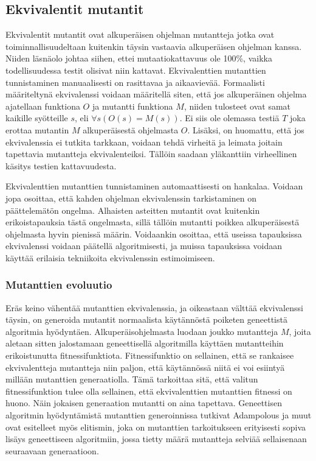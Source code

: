\documentclass{tktltiki}
\begin{document}
\subsection{Ekvivalentit mutantit}
Ekvivalentit mutantit ovat alkuperäisen ohjelman mutantteja jotka ovat toiminnallisuudeltaan kuitenkin täysin vastaavia alkuperäisen ohjelman kanssa. Niiden läsnäolo johtaa siihen, ettei mutaatiokattavuus ole 100\%, vaikka todellisuudessa testit olisivat niin kattavat. Ekvivalenttien mutanttien tunnistaminen manuaalisesti on rasittavaa ja aikaavievää. Formaalisti määriteltynä ekvivalenssi voidaan määritellä siten, että jos alkuperäinen ohjelma ajatellaan funktiona $O$ ja mutantti funktiona $M$, niiden tulosteet ovat samat kaikille syötteille $s$, eli $\forall s(O(s) = M(s))$. Ei siis ole olemassa testiä $T$ joka erottaa mutantin $M$ alkuperäisestä ohjelmasta $O$. Lisäksi, on huomattu, että jos ekvivalenssia ei tutkita tarkkaan, voidaan tehdä virheitä ja leimata joitain tapettavia mutantteja ekvivalenteiksi. Tällöin saadaan yläkanttiin virheellinen käsitys testien kattavuudesta. %

Ekvivalenttien mutanttien tunnistaminen automaattisesti on hankalaa. Voidaan jopa osoittaa, että kahden ohjelman ekvivalenssin tarkistaminen on päättelemätön ongelma. Alhaisten asteitten mutantit ovat kuitenkin erikoistapauksia tästä ongelmasta, sillä tällöin mutantti poikkea alkuperäisestä ohjelmasta hyvin pienissä määrin. Voidaankin osoittaa, että useissa tapauksissa ekvivalenssi voidaan päätellä algoritmisesti, ja muissa tapauksissa voidaan käyttää erilaisia tekniikoita ekvivalenssin estimoimiseen. 

\subsubsection{Mutanttien evoluutio}
Eräs keino vähentää mutanttien ekvivalenssia, ja oikeastaan välttää ekvivalenssi täysin, on generoida mutantit normaalista käytännöstä poiketen geneettistä algoritmia hyödyntäen. Alkuperäisohjelmasta luodaan joukko mutantteja $M$, joita aletaan sitten jalostamaan geneettisellä algoritmilla käyttäen mutantteihin erikoistunutta fitnessifunktiota. Fitnessifunktio on sellainen, että se rankaisee ekvivalentteja mutantteja niin paljon, että käytännössä niitä ei voi esiintyä millään mutanttien generaatiolla. Tämä tarkoittaa sitä, että valitun fitnessifunktion tulee olla sellainen, että ekvivalenttien mutanttien fitnessi on huono. Näin jokaisen generaation mutantti on aina tapettava. Geneettisen algoritmin hyödyntämistä mutanttien generoinnissa tutkivat Adampolous ja muut ovat esitelleet myös elitismin, joka on mutanttien tarkoitukseen erityisesti sopiva lisäys geneettiseen algoritmiin, jossa tietty määrä mutantteja selviää sellaisenaan seuraavaan generaatioon.
\end{document}
